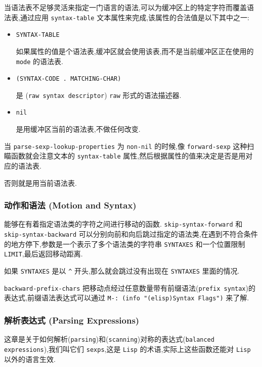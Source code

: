 \documentclass[11pt]{article}
\begin{document}
当语法表不足够灵活来指定一门语言的语法,可以为缓冲区上的特定字符而覆盖语法表,通过应用 \texttt{syntax-table} 文本属性来完成,该属性的合法值是以下其中之一:

\begin{itemize}
\item \texttt{SYNTAX-TABLE}

如果属性的值是个语法表,缓冲区就会使用该表,而不是当前缓冲区正在使用的 \texttt{mode} 的语法表.

\item \texttt{(SYNTAX-CODE . MATCHING-CHAR)}

是 (\texttt{raw syntax descriptor}) \texttt{raw} 形式的语法描述器.

\item \texttt{nil}

是用缓冲区当前的语法表,不做任何改变.
\end{itemize}

当 \texttt{parse-sexp-lookup-properties} 为 \texttt{non-nil} 的时候,像 \texttt{forward-sexp} 这种扫瞄函数就会注意文本的 \texttt{syntax-table} 属性,然后根据属性的值来决定是否是用对应的语法表.

否则就是用当前语法表.


\subsubsection{动作和语法 (Motion and Syntax)}
\label{sec:orgdd8506d}

能够在有着指定语法类的字符之间进行移动的函数. \texttt{skip-syntax-forward} 和 \texttt{skip-syntax-backward} 可以分别向前和向后跳过指定的语法类,在遇到不符合条件的地方停下,参数是一个表示了多个语法类的字符串 \texttt{SYNTAXES} 和一个位置限制 \texttt{LIMIT},最后返回移动距离.

如果 \texttt{SYNTAXES} 是以 \texttt{\textasciicircum{}} 开头,那么就会跳过没有出现在 \texttt{SYNTAXES} 里面的情况.

\texttt{backward-prefix-chars} 把移动点经过任意数量带有前缀语法(\texttt{prefix syntax})的表达式,前缀语法表达式可以通过 \texttt{M-: (info "(elisp)Syntax Flags")} 来了解.


\subsubsection{解析表达式 (Parsing Expressions)}
\label{sec:org4ab1652}

这章是关于如何解析(\texttt{parsing})和(\texttt{scanning})对称的表达式(\texttt{balanced expressions}),我们叫它们 \texttt{sexps},这是 \texttt{Lisp} 的术语,实际上这些函数还能对 \texttt{Lisp} 以外的语言生效.
\end{document}
